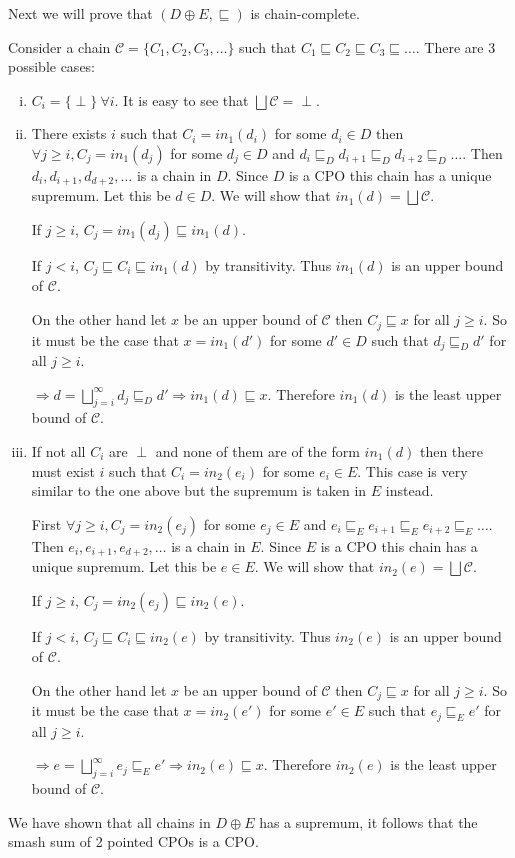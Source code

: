 \begin{enumerate}[(a)]
Next we will prove that $(D \oplus E, \sqsubseteq)$ is chain-complete.

Consider a chain $\mathcal C = \{C_1, C_2, C_3, \ldots \}$ such that $C_1 \sqsubseteq C_2 \sqsubseteq C_3 \sqsubseteq \ldots$. There are 3 possible cases:
\begin{enumerate}[(i)]
\item $C_i = \{ \perp \}~\forall i$. It is easy to see that $\bigsqcup \mathcal C = \perp$.
\item There exists $i$ such that $C_i = in_1(d_i)$ for some $d_i \in D$ then $\forall j \geq i, C_j = in_1(d_j)$ for some $d_j \in D$ and $d_i \sqsubseteq_D d_{i+1} \sqsubseteq_D d_{i+2} \sqsubseteq_D \ldots$. Then $d_i, d_{i+1}, d_{d+2}, \ldots$ is a chain in $D$. Since $D$ is a CPO this chain has a unique supremum. Let this be $d \in D$. We will show that $in_1(d) = \bigsqcup \mathcal C$.

If $j \geq i$, $C_j = in_1(d_j) \sqsubseteq in_1(d)$.

If $j < i$, $C_j \sqsubseteq C_i \sqsubseteq in_1(d)$ by transitivity. Thus $in_1(d)$ is an upper bound of $\mathcal C$.

On the other hand let $x$ be an upper bound of $\mathcal C$ then $C_j \sqsubseteq x$ for all $j \geq i$. So it must be the case that $x = in_1(d')$ for some $d' \in D$ such that $d_j \sqsubseteq_D d'$ for all $j \geq i$.

$\Rightarrow d = \bigsqcup\limits_{j = i}^{\infty} d_j \sqsubseteq_D d' \Rightarrow in_1(d) \sqsubseteq x$. Therefore $in_1(d)$ is the least upper bound of $\mathcal C$.

\item If not all $C_i$ are $\perp$ and none of them are of the form $in_1(d)$ then there must exist $i$ such that $C_i = in_2(e_i)$ for some $e_i \in E$. This case is very similar to the one above but the supremum is taken in $E$ instead.

First $\forall j \geq i, C_j = in_2(e_j)$ for some $e_j \in E$ and $e_i \sqsubseteq_E e_{i+1} \sqsubseteq_E e_{i+2} \sqsubseteq_E \ldots$. Then $e_i, e_{i+1}, e_{d+2}, \ldots$ is a chain in $E$. Since $E$ is a CPO this chain has a unique supremum. Let this be $e \in E$. We will show that $in_2(e) = \bigsqcup \mathcal C$.

If $j \geq i$, $C_j = in_2(e_j) \sqsubseteq in_2(e)$.

If $j < i$, $C_j \sqsubseteq C_i \sqsubseteq in_2(e)$ by transitivity. Thus $in_2(e)$ is an upper bound of $\mathcal C$.

On the other hand let $x$ be an upper bound of $\mathcal C$ then $C_j \sqsubseteq x$ for all $j \geq i$. So it must be the case that $x = in_2(e')$ for some $e' \in E$ such that $e_j \sqsubseteq_E e'$ for all $j \geq i$.

$\Rightarrow e = \bigsqcup\limits_{j = i}^{\infty} e_j \sqsubseteq_E e' \Rightarrow in_2(e) \sqsubseteq x$. Therefore $in_2(e)$ is the least upper bound of $\mathcal C$.
\end{enumerate}

We have shown that all chains in $D \oplus E$ has a supremum, it follows that the smash sum of 2 pointed CPOs is a CPO.
\end{enumerate}